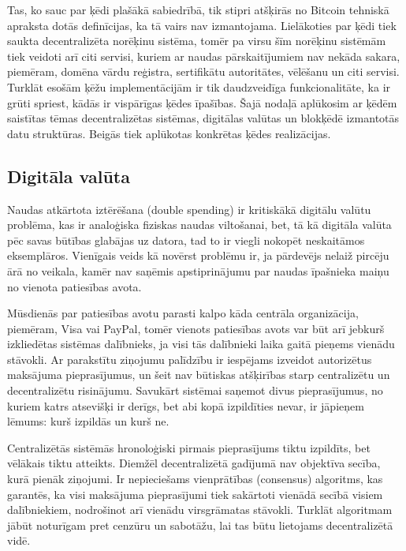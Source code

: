 Tas, ko sauc par ķēdi plašākā sabiedrībā, tik stipri atšķirās no Bitcoin tehniskā apraksta\cite{nakamoto08} dotās definīcijas, ka tā vairs nav izmantojama. 
Lielākoties par ķēdi tiek saukta decentralizēta norēķinu sistēma, tomēr pa virsu šīm norēķinu sistēmām tiek veidoti arī citi servisi, kuriem ar naudas pārskaitījumiem nav nekāda sakara, piemēram, domēna vārdu reģistra, sertifikātu autoritātes, vēlēšanu un citi servisi.\cite{namecoin}
Turklāt esošām ķēžu implementācijām ir tik daudzveidīga funkcionalitāte, ka ir grūti spriest, kādās ir vispārīgas ķēdes īpašības.
Šajā nodaļā aplūkosim ar ķēdēm saistītas tēmas \textemdash{} decentralizētas sistēmas, digitālas valūtas un blokķēdē izmantotās datu struktūras. Beigās tiek aplūkotas konkrētas ķēdes realizācijas.

\subsection{Digitāla valūta}
Naudas atkārtota iztērēšana (double spending) ir kritiskākā digitālu valūtu problēma, kas ir analoģiska fiziskas naudas viltošanai, bet, tā kā digitāla valūta pēc savas būtības glabājas uz datora, tad to ir viegli nokopēt neskaitāmos eksemplāros. Vienīgais veids kā novērst problēmu ir, ja pārdevējs nelaiž pircēju ārā no veikala, kamēr nav saņēmis apstiprinājumu par naudas īpašnieka maiņu no vienota patiesības avota.\cite{frankel96}

Mūsdienās par patiesības avotu parasti kalpo kāda centrāla organizācija, piemēram, Visa vai PayPal, tomēr vienots patiesības avots var būt arī jebkurš izkliedētas sistēmas dalībnieks, ja visi tās dalībnieki laika gaitā pieņems vienādu stāvokli.
Ar parakstītu ziņojumu palīdzību ir iespējams izveidot autorizētus maksājuma pieprasījumus, un šeit nav būtiskas atšķirības starp centralizētu un decentralizētu risinājumu. Savukārt sistēmai saņemot divus pieprasījumus, no kuriem katrs atsevišķi ir derīgs, bet abi kopā izpildīties nevar, ir jāpieņem lēmums: kurš izpildās un kurš ne.

Centralizētās sistēmās hronoloģiski pirmais pieprasījums tiktu izpildīts, bet vēlākais tiktu atteikts. Diemžēl decentralizētā gadījumā nav objektīva secība, kurā pienāk ziņojumi. Ir nepieciešams vienprātības (consensus) algoritms, kas garantēs, ka visi maksājuma pieprasījumi tiek sakārtoti vienādā secībā visiem dalībniekiem, nodrošinot arī vienādu virsgrāmatas stāvokli.
Turklāt algoritmam jābūt noturīgam pret cenzūru un sabotāžu, lai tas būtu lietojams decentralizētā vidē.

